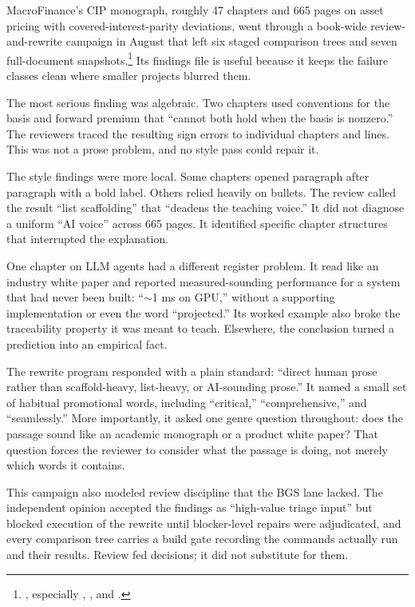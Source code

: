 MacroFinance's CIP monograph, roughly 47 chapters and 665 pages on asset
pricing with covered-interest-parity deviations, went through a book-wide
review-and-rewrite campaign in August that left six staged comparison trees
and seven full-document
snapshots.\footnote{, especially , , and .}
Its findings file is useful because it keeps the failure classes clean where
smaller projects blurred them.

The most serious finding was algebraic. Two chapters used conventions for the
basis and forward premium that ``cannot both hold when the basis is nonzero.''
The reviewers traced the resulting sign errors to individual chapters and
lines. This was not a prose problem, and no style pass could repair it.

The style findings were more local. Some chapters opened paragraph after
paragraph with a bold label. Others relied heavily on bullets. The review
called the result ``list scaffolding'' that ``deadens the teaching voice.'' It
did not diagnose a uniform ``AI voice'' across 665 pages. It identified
specific chapter structures that interrupted the explanation.

One chapter on LLM agents had a different register problem. It read like an
industry white paper and reported measured-sounding performance for a system
that had never been built: ``$\sim$1 ms on GPU,'' without a supporting
implementation or even the word ``projected.'' Its worked example also broke
the traceability property it was meant to teach. Elsewhere, the conclusion
turned a prediction into an empirical fact.

The rewrite program responded with a plain standard: ``direct human prose
rather than scaffold-heavy, list-heavy, or AI-sounding prose.'' It named a
small set of habitual promotional words, including ``critical,''
``comprehensive,'' and ``seamlessly.'' More importantly, it asked one genre
question throughout: does the passage sound like an academic monograph or a
product white paper? That question forces the reviewer to consider what the
passage is doing, not merely which words it contains.

This campaign also modeled review discipline that the BGS lane lacked. The
independent opinion accepted the findings as ``high-value triage input'' but
blocked execution of the rewrite until blocker-level repairs were
adjudicated, and every comparison tree carries a build gate recording the
commands actually run and their results. Review fed decisions; it did not
substitute for them.

